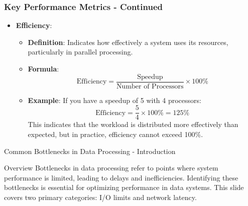 \documentclass[aspectratio=169]{beamer}
\begin{document}
\begin{frame}[fragile]
    \frametitle{Key Performance Metrics - Continued}
    \begin{itemize}
        \item \textbf{Efficiency}:
        \begin{itemize}
            \item \textbf{Definition}: Indicates how effectively a system uses its resources, particularly in parallel processing.
            \item \textbf{Formula}:
            \begin{equation*}
                \text{Efficiency} = \frac{\text{Speedup}}{\text{Number of Processors}} \times 100\%
            \end{equation*}
            \item \textbf{Example}: If you have a speedup of 5 with 4 processors:
            \begin{equation*}
                \text{Efficiency} = \frac{5}{4} \times 100\% = 125\%
            \end{equation*}
            This indicates that the workload is distributed more effectively than expected, but in practice, efficiency cannot exceed 100\%.
        \end{itemize}
    \end{itemize}
\end{frame}

\begin{frame}[fragile]{Common Bottlenecks in Data Processing - Introduction}
    \begin{block}{Overview}
        Bottlenecks in data processing refer to points where system performance is limited, leading to delays and inefficiencies. 
        Identifying these bottlenecks is essential for optimizing performance in data systems. 
        This slide covers two primary categories: I/O limits and network latency.
    \end{block}
\end{frame}
\end{document}
